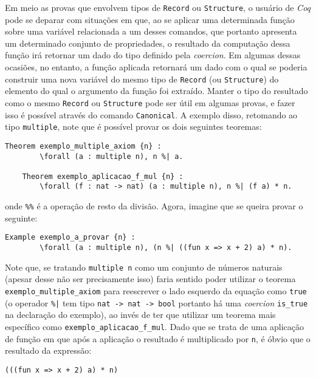 Em meio as provas que envolvem tipos de \lstinline[language = coq]$Record$ ou \lstinline[language = coq]$Structure$, o usuário de \textit{Coq} pode se deparar com situações em que, ao se aplicar uma determinada função sobre uma variável relacionada a um desses comandos, que portanto apresenta um determinado conjunto de propriedades, o resultado da computação dessa função irá retornar um dado do tipo definido pela \textit{coercion}. Em algumas dessas ocasiões, no entanto, a função aplicada retornará um dado com o qual se poderia construir uma nova variável do mesmo tipo de \lstinline[language = coq]$Record$ (ou \lstinline[language = coq]$Structure$) do elemento do qual o argumento da função foi extraído. Manter o tipo do resultado como o mesmo \lstinline[language = coq]$Record$ ou \lstinline[language = coq]$Structure$ pode ser útil em algumas provas, e fazer isso é possível através do comando \lstinline[language = coq]$Canonical$. A exemplo disso, retomando ao tipo \lstinline[language = coq]$multiple$, note que é possível provar os dois seguintes teoremas:
\begin{lstlisting}[language = coq]
    Theorem exemplo_multiple_axiom {n} :
        \forall (a : multiple n), n %| a.

    Theorem exemplo_aplicacao_f_mul {n} :
        \forall (f : nat -> nat) (a : multiple n), n %| (f a) * n.
\end{lstlisting}
onde \lstinline[language = coq]$%%$ é a operação de resto da divisão. Agora, imagine que se queira provar o seguinte:
\begin{lstlisting}[language = coq]
    Example exemplo_a_provar {n} :
        \forall (a : multiple n), (n %| ((fun x => x + 2) a) * n).
\end{lstlisting}
Note que, se tratando \lstinline[language = coq]!multiple n! como um conjunto de números naturais (apesar desse não ser precisamente isso) faria sentido poder utilizar o teorema \lstinline[language = coq]!exemplo_multiple_axiom! para reescrever o lado esquerdo da equação como \lstinline[language = coq]!true! (o operador  \lstinline[language = coq]!%|! tem tipo \lstinline[language = coq]!nat -> nat -> bool! portanto há uma \textit{coercion} \lstinline[language = coq]!is_true! na declaração do exemplo), ao invés de ter que utilizar um teorema mais específico como \lstinline[language = coq]!exemplo_aplicacao_f_mul!. Dado que se trata de uma aplicação de função em que após a aplicação o resultado é multiplicado por \lstinline[language = coq]!n!, é óbvio que o resultado da expressão:
\begin{lstlisting}[language = coq]
    (((fun x => x + 2) a) * n)
\end{lstlisting} 
